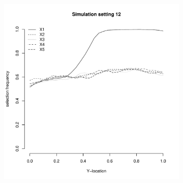 \documentclass[authoryear, review, 11pt]{elsarticle}
\begin{document}
\begin{figure}
\begin{subfigure}[b]{0.3\textwidth}
			\label{fig:tiger}
		\end{subfigure}
        ~ %
		\begin{subfigure}[b]{0.3\textwidth}
			\centering
			\includegraphics[width=\textwidth]{../../figures/simulation/28-12-profile-selection.pdf}
			\label{fig:mouse}
		\end{subfigure}
	\end{figure}
	
\end{document}

